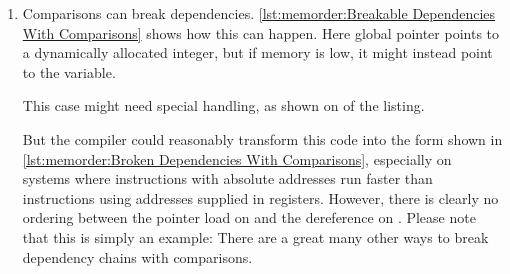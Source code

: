 \begin{enumerate}
\item	Comparisons can break dependencies.
	\cref{lst:memorder:Breakable Dependencies With Comparisons}
	shows how this can happen.
	Here global pointer  points to a dynamically allocated
	integer, but if memory is low, it might instead point to
	the  variable.
	\begin{fcvref}
	This  case might need special handling, as
	shown on  of the listing.
	\end{fcvref}
        \begin{fcvref}
	But the compiler could reasonably transform this code into
	the form shown in
	\cref{lst:memorder:Broken Dependencies With Comparisons},
	especially on systems where instructions with absolute
	addresses run faster than instructions using addresses
	supplied in registers.
	However, there is clearly no ordering between the pointer
	load on  and the dereference on .
	Please note that this is simply an example: There are a great
	many other ways to break dependency chains with comparisons.
	\end{fcvref}

\fi

\end{enumerate}

